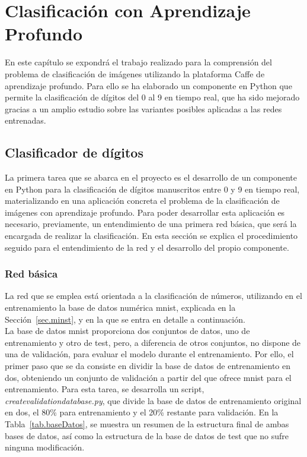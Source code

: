 \chapter{Clasificación con Aprendizaje Profundo}\label{cap.clasificacion}
En este capítulo se expondrá el trabajo realizado para la comprensión del problema de clasificación de imágenes utilizando la plataforma Caffe de aprendizaje profundo. Para ello se ha elaborado un componente en Python que permite la clasificación de dígitos del 0 al 9 en tiempo real, que ha sido mejorado gracias a un amplio estudio sobre las variantes posibles aplicadas a las redes entrenadas.

\section{Clasificador de dígitos}
La primera tarea que se abarca en el proyecto es el desarrollo de un componente en Python para la clasificación de dígitos manuscritos entre 0 y 9 en tiempo real, materializando en una aplicación concreta el problema de la clasificación de imágenes con aprendizaje profundo. Para poder desarrollar esta aplicación es necesario, previamente, un entendimiento de una primera red básica, que será la encargada de realizar la clasificación. En esta sección se explica el procedimiento seguido para el entendimiento de la red y el desarrollo del propio componente.

\subsection{Red básica}\label{sec.red}
La red que se emplea está orientada a la clasificación de números, utilizando en el entrenamiento la base de datos numérica \acrshort{mnist}, explicada en la Sección~\ref{sec.minst}, y en la que se entra en detalle a continuación.\\

La base de datos \acrshort{mnist} proporciona dos conjuntos de datos, uno de entrenamiento y otro de test, pero, a diferencia de otros conjuntos, no dispone de una de validación, para evaluar el modelo durante el entrenamiento. Por ello, el primer paso que se da consiste en dividir la base de datos de entrenamiento en dos, obteniendo un conjunto de validación a partir del que ofrece \acrshort{mnist} para el entrenamiento. Para esta tarea, se desarrolla un script, \textit{createvalidationdatabase.py}, que divide la base de datos de entrenamiento original en dos, el 80\% para entrenamiento y el 20\% restante para validación. En la Tabla~\ref{tab.baseDatos}, se muestra un resumen de la estructura final de ambas bases de datos, así como la estructura de la base de datos de test que no sufre ninguna modificación.\\

